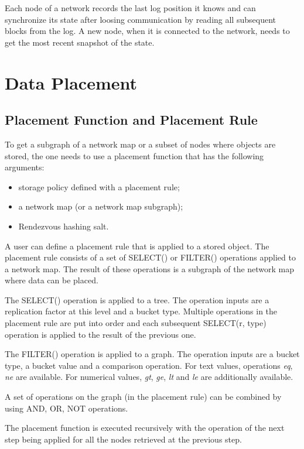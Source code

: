 \documentclass[a4paper, 11pt]{article}
\begin{document}
Each node of a network records the last log position it knows and can
synchronize its state after loosing communication by reading all subsequent
blocks from the log. A new node, when it is connected to the network, needs to get
the most recent snapshot of the state.

\section{Data Placement}

\subsection{Placement Function and Placement Rule}

To get a subgraph of a network map or a subset of nodes where objects are
stored, the one needs to use a placement function that has the following
arguments:

\begin{itemize}%
\item storage policy defined with a placement rule;
\item a network map (or a network map subgraph);
\item Rendezvous hashing salt.
\end{itemize}

A user can define a placement rule that is applied to a stored object. The
placement rule consists of a set of SELECT() or FILTER() operations applied to
a network map. The result of these operations is a subgraph of the network map
where data can be placed.

The SELECT() operation is applied to a tree. The operation inputs are a
replication factor at this level and a bucket type. Multiple operations in the
placement rule are put into order and each subsequent SELECT(r, type) operation
is applied to the result of the previous one.

The FILTER() operation is applied to a graph. The operation inputs are a
bucket type, a bucket value and a comparison operation. For text values, 
operations \textit{eq}, \textit{ne} are available. For numerical values,
\textit{gt}, \textit{ge}, \textit{lt} and \textit{le} are additionally
available.

A set of operations on the graph (in the placement rule) can be combined by
using AND, OR, NOT operations.

The placement function is executed recursively with the operation of the next
step being applied for all the nodes retrieved at the previous step. 
\end{document}
